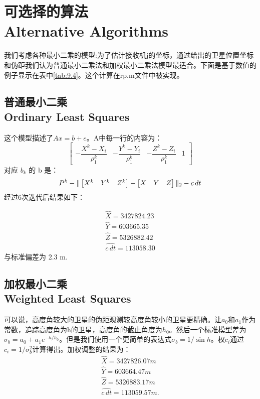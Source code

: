 \section[可选择的算法]{可选择的算法\\Alternative Algorithms}
	我们考虑各种最小二乘的模型:为了估计接收机j的坐标，通过给出的卫星位置坐标和伪距我们认为普通最小二乘法和加权最小二乘法模型最适合。下面是基于数值的例子显示在表中\ref{tab:9.4}。这个计算在rp.m文件中被实现。
	\subsection[普通最小二乘]{普通最小二乘\\Ordinary Least Squares}
	这个模型描述了$Ax=b+e$。A中每一行的内容为：
	\begin{equation*}
		\begin{bmatrix}
		
		-\dfrac{X^k-X_i}{\rho^k_1} & -\dfrac{Y^k-Y_i}{\rho^k_1} & -\dfrac{Z^k-Z_i}{\rho^k_1} & 1
		
		\end{bmatrix}
	\end{equation*}
	对应 $b_k$ 的 b 是：
	\begin{equation*}
		P^k - \Arrowvert 
		\begin{bmatrix}
			X^k & Y^k & Z^k
		\end{bmatrix}-
		\begin{bmatrix}
		
		X & Y & Z
		
		\end{bmatrix}
		\Arrowvert_2
		-c\,dt
	\end{equation*}
	经过6次迭代后结果如下：

	\begin{align*}
		\hat{X} = 3427824.23 \\
		\hat{Y} =  603665.35 \\
		\hat{Z} = 5326882.42 \\
		\hat{c\,dt} =  113058.30
	\end{align*}
		与标准偏差为 2.3 m.
	\subsection[加权最小二乘]{加权最小二乘\\Weighted Least Squares}
	可以说，高度角较大的卫星的伪距观测较高度角较小的卫星更精确。让$a_0$和$a_1$作为常数，追踪高度角为h的卫星，高度角的截止角度为$h_0$。然后一个标准模型差为$\sigma_b = a_0 + a_1e^{-h/h_0}$。但是我们使用一个更简单的表达式$\sigma_b=1/\sin h$。权$c_i$通过$c_i=1/\sigma^2_b$计算得出。加权调整的结果为：
		\begin{align*}
			\hat{X} = 3427826.07 m \\
			\hat{Y} =  603664.47 m \\
			\hat{Z} = 5326883.17 m \\
			\hat{c\,dt} = 113059.57 m.
		\end{align*}

